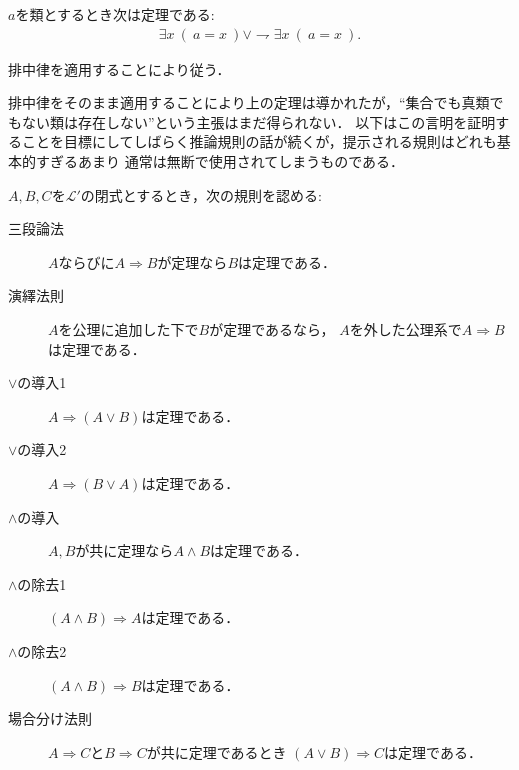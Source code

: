 	
	\begin{screen}
		\begin{thm}[類は集合であるか真類であるかのいずれかに定まる]
			$a$を類とするとき次は定理である:
			\begin{align}
				\exists x\ (\ a=x\ ) \vee \rightharpoondown \exists x\ (\ a=x\ ).
			\end{align}
		\end{thm}
	\end{screen}
	
	\begin{prf}
		排中律を適用することにより従う．
		\QED
	\end{prf}
	
	排中律をそのまま適用することにより上の定理は導かれたが，``集合でも真類でもない類は存在しない''という主張はまだ得られない．
	以下はこの言明を証明することを目標にしてしばらく推論規則の話が続くが，提示される規則はどれも基本的すぎるあまり
	通常は無断で使用されてしまうものである．
	
	\begin{screen}
		\begin{metaaxm}[基本的な推論規則]\label{metaaxm:fundamental_rules_of_inference}
			$A,B,C$を$\mathcal{L}'$の閉式とするとき，次の規則を認める:
			\begin{description}
				\item[三段論法] $A$ならびに$A \Longrightarrow B$が定理なら$B$は定理である．
				\item[演繹法則] $A$を公理に追加した下で$B$が定理であるなら，
					$A$を外した公理系で$A \Longrightarrow B$は定理である．
				\item[$\vee$の導入1] $A \Longrightarrow (A \vee B)$は定理である．
				\item[$\vee$の導入2] $A \Longrightarrow (B \vee A)$は定理である．
				\item[$\wedge$の導入] $A,B$が共に定理なら$A \wedge B$は定理である．
				\item[$\wedge$の除去1] $(A \wedge B) \Longrightarrow A$は定理である．
				\item[$\wedge$の除去2] $(A \wedge B) \Longrightarrow B$は定理である．
				\item[場合分け法則] $A \Longrightarrow C$と$B \Longrightarrow C$が共に定理であるとき
					$(A \vee B) \Longrightarrow C$は定理である．
			\end{description}	
		\end{metaaxm}
	\end{screen}
	
